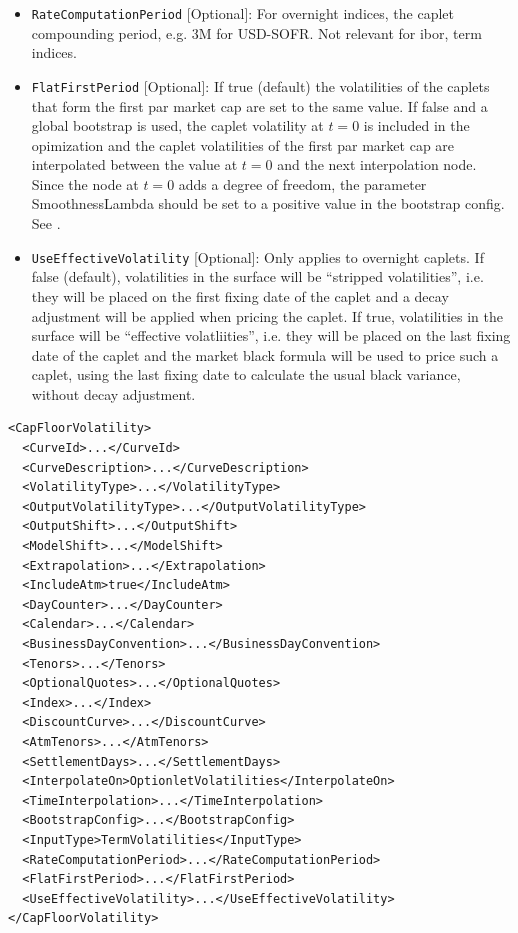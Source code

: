 \begin{itemize}
\item \lstinline!RateComputationPeriod! [Optional]:
For overnight indices, the caplet compounding period, e.g. 3M for USD-SOFR. Not relevant for ibor, term indices.

\item \lstinline!FlatFirstPeriod! [Optional]:
If true (default) the volatilities of the caplets that form the first par market cap are set to the same value. If false
and a global bootstrap is used, the caplet volatility at $t=0$ is included in the opimization and the caplet
volatilities of the first par market cap are interpolated between the value at $t=0$ and the next interpolation
node. Since the node at $t=0$ adds a degree of freedom, the parameter SmoothnessLambda should be set to a positive value
in the bootstrap config. See \label{sec:bootstrap_config}.

\item \lstinline!UseEffectiveVolatility! [Optional]:
Only applies to overnight caplets. If false (default), volatilities in the surface will be ``stripped volatilities'',
i.e. they will be placed on the first fixing date of the caplet and a decay adjustment will be applied when pricing the
caplet. If true, volatilities in the surface will be ``effective volatliities'', i.e. they will be placed on the last
fixing date of the caplet and the market black formula will be used to price such a caplet, using the last fixing date
to calculate the usual black variance, without decay adjustment.

\end{itemize}

\begin{longlisting}
\begin{verbatim}
<CapFloorVolatility>
  <CurveId>...</CurveId>
  <CurveDescription>...</CurveDescription>
  <VolatilityType>...</VolatilityType>
  <OutputVolatilityType>...</OutputVolatilityType>
  <OutputShift>...</OutputShift>
  <ModelShift>...</ModelShift>
  <Extrapolation>...</Extrapolation>
  <IncludeAtm>true</IncludeAtm>
  <DayCounter>...</DayCounter>
  <Calendar>...</Calendar>
  <BusinessDayConvention>...</BusinessDayConvention>
  <Tenors>...</Tenors>
  <OptionalQuotes>...</OptionalQuotes>
  <Index>...</Index>
  <DiscountCurve>...</DiscountCurve>
  <AtmTenors>...</AtmTenors>
  <SettlementDays>...</SettlementDays>
  <InterpolateOn>OptionletVolatilities</InterpolateOn>
  <TimeInterpolation>...</TimeInterpolation>
  <BootstrapConfig>...</BootstrapConfig>
  <InputType>TermVolatilities</InputType>
  <RateComputationPeriod>...</RateComputationPeriod>
  <FlatFirstPeriod>...</FlatFirstPeriod>
  <UseEffectiveVolatility>...</UseEffectiveVolatility>
</CapFloorVolatility>
\end{verbatim}
\caption{ATM cap floor configuration with interpolation on optionlet volatilities.}
\label{lst:capfloorvol_atm_configuration_opt}
\end{longlisting}

